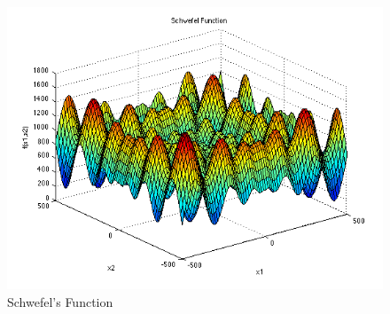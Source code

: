 \documentclass{article}
\begin{document}
\begin{figure}[!h]
  \includegraphics[width=\textwidth,height=\textheight,keepaspectratio]{schwef.png}
  \caption{Schwefel's Function\cite{schwef_img}}
\end{figure}
\end{document}
